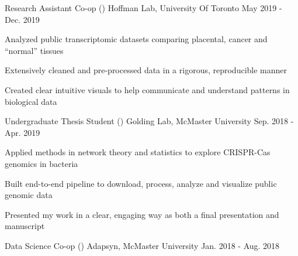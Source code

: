 \begin{cventries}
\cventry
{Research Assistant Co-op ()}
{Hoffman Lab, University Of Toronto}
{May 2019 - Dec. 2019}
{}
{
\begin{cvitems}
\item {Analyzed public transcriptomic datasets comparing placental, cancer and ``normal'' tissues}
\item {Extensively cleaned and pre-processed data in a rigorous, reproducible manner}
\item {Created clear intuitive visuals to help communicate and understand patterns in biological data}
\end{cvitems}
}
\cventry
{Undergraduate Thesis Student ()}
{Golding Lab, McMaster University}
{Sep. 2018 - Apr. 2019}
{}
{
\begin{cvitems}
    \item {Applied methods in network theory and statistics to explore CRISPR-Cas genomics in bacteria}
    \item {Built end-to-end pipeline to download, process, analyze and visualize public genomic data}
    \item {Presented my work in a clear, engaging way as both a final presentation and manuscript}
\end{cvitems}
}
\cventry
{Data Science Co-op ()}
{Adapsyn, McMaster University}
{Jan. 2018 - Aug. 2018}
{}
{
\begin{cvitems}

\end{cvitems}}
\end{cventries}
